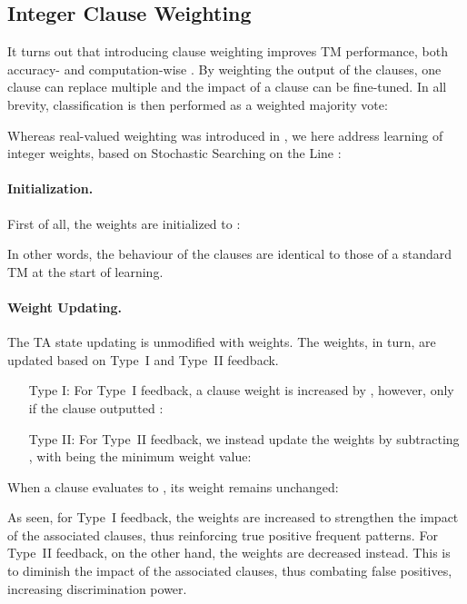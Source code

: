 \documentclass{article}
\begin{document}
\subsection{Integer Clause Weighting}

It turns out that introducing clause weighting improves TM performance, both accuracy- and computation-wise \cite{phoulady2019weighted}. By weighting the output of the clauses, one clause can replace multiple and the impact of a clause can be fine-tuned. In all brevity, classification is then performed as a weighted majority vote:



Whereas real-valued weighting was introduced in \cite{phoulady2019weighted}, we here address learning of integer weights, based on Stochastic Searching on the Line \cite{Oommen1997}:

\paragraph{Initialization.} First of all, the weights are initialized to :

In other words, the behaviour of the clauses are identical to those of a standard TM at the start of learning.

\paragraph{Weight Updating.} The TA state updating is unmodified with weights. The weights, in turn, are updated based on Type~I and Type~II feedback.
\begin{itemize}
\item[Type I:] For Type~I feedback, a clause weight is increased by , however, only if the clause outputted :

\item[Type II:] For Type~II feedback, we instead update the weights by subtracting , with  being the minimum weight value:

\end{itemize}
When a clause evaluates to , its weight remains unchanged:

As seen, for Type~I feedback, the weights are increased to strengthen the impact of the associated clauses, thus reinforcing true positive frequent patterns. For Type~II feedback, on the other hand, the weights are decreased instead. This is to diminish the impact of the associated clauses, thus combating false positives, increasing discrimination power.
\end{document}
